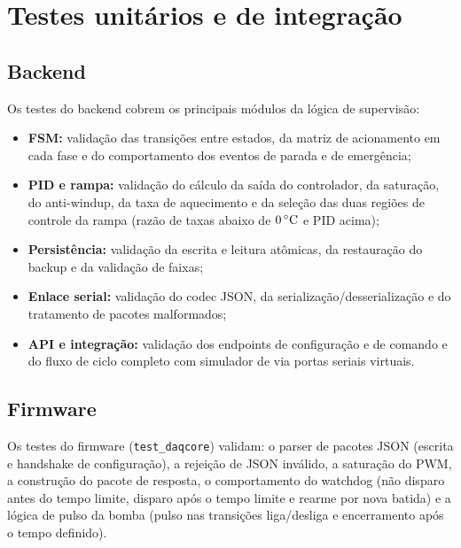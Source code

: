 \par{}

\section{Testes unit\'arios e de integra\c{c}\~ao}

\subsection{Backend}

Os testes do backend cobrem os principais m\'odulos da l\'ogica de supervis\~ao:

\begin{itemize}
  \item \textbf{FSM:} valida\c{c}\~ao das transi\c{c}\~oes entre estados, da
  matriz de acionamento em cada fase e do comportamento dos eventos de parada e
  de emerg\^encia;
  \item \textbf{PID e rampa:} valida\c{c}\~ao do c\'alculo da sa\'ida do
  controlador, da satura\c{c}\~ao, do anti-windup, da taxa de aquecimento e da
  sele\c{c}\~ao das duas regi\~oes de controle da rampa (raz\~ao de taxas abaixo
  de $0\,\celsius$ e PID acima);
  \item \textbf{Persist\^encia:} valida\c{c}\~ao da escrita e leitura at\^omicas,
  da restaura\c{c}\~ao do backup e da valida\c{c}\~ao de faixas;
  \item \textbf{Enlace serial:} valida\c{c}\~ao do codec JSON, da
  serializa\c{c}\~ao/desserializa\c{c}\~ao e do tratamento de pacotes
  malformados;
  \item \textbf{API e integra\c{c}\~ao:} valida\c{c}\~ao dos endpoints de
  configura\c{c}\~ao e de comando e do fluxo de ciclo completo com simulador de
  \daq via portas seriais virtuais.
\end{itemize}

\subsection{Firmware}

Os testes do firmware (\texttt{test\_daqcore}) validam: o parser de pacotes JSON
(escrita e handshake de configura\c{c}\~ao), a rejei\c{c}\~ao de JSON inv\'alido,
a satura\c{c}\~ao do PWM, a constru\c{c}\~ao do pacote de resposta, o
comportamento do watchdog (n\~ao disparo antes do tempo limite, disparo ap\'os o
tempo limite e rearme por nova batida) e a l\'ogica de pulso da bomba (pulso nas
transi\c{c}\~oes liga/desliga e encerramento ap\'os o tempo definido).

